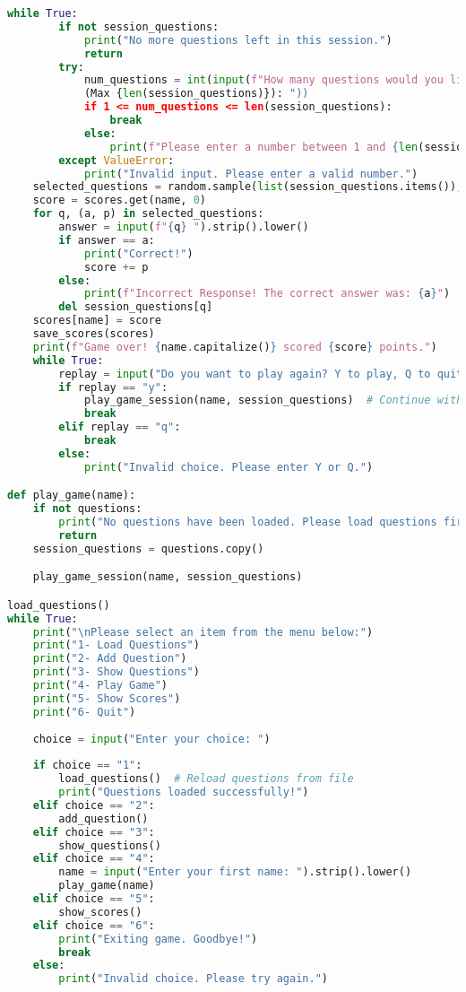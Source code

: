 \documentclass{article}
\begin{document}
\begin{lstlisting}[language=Python]
    while True:
        if not session_questions:
            print("No more questions left in this session.")
            return 
        try:
            num_questions = int(input(f"How many questions would you like to attempt? 
            (Max {len(session_questions)}): "))
            if 1 <= num_questions <= len(session_questions):
                break
            else:
                print(f"Please enter a number between 1 and {len(session_questions)}.")
        except ValueError:
            print("Invalid input. Please enter a valid number.")
    selected_questions = random.sample(list(session_questions.items()), num_questions)
    score = scores.get(name, 0)
    for q, (a, p) in selected_questions:
        answer = input(f"{q} ").strip().lower()
        if answer == a:
            print("Correct!")
            score += p
        else:
            print(f"Incorrect Response! The correct answer was: {a}")
        del session_questions[q]  
    scores[name] = score
    save_scores(scores)
    print(f"Game over! {name.capitalize()} scored {score} points.")
    while True:
        replay = input("Do you want to play again? Y to play, Q to quit: ").strip().lower()
        if replay == "y":
            play_game_session(name, session_questions)  # Continue with remaining questions
            break
        elif replay == "q":
            break
        else:
            print("Invalid choice. Please enter Y or Q.")

def play_game(name):
    if not questions:
        print("No questions have been loaded. Please load questions first.")
        return
    session_questions = questions.copy()

    play_game_session(name, session_questions)

load_questions()
while True:
    print("\nPlease select an item from the menu below:")
    print("1- Load Questions")
    print("2- Add Question")
    print("3- Show Questions")
    print("4- Play Game")
    print("5- Show Scores")
    print("6- Quit")
        
    choice = input("Enter your choice: ")
        
    if choice == "1":
        load_questions()  # Reload questions from file
        print("Questions loaded successfully!")
    elif choice == "2":
        add_question()
    elif choice == "3":
        show_questions()
    elif choice == "4":
        name = input("Enter your first name: ").strip().lower() 
        play_game(name) 
    elif choice == "5":
        show_scores()
    elif choice == "6":
        print("Exiting game. Goodbye!")
        break
    else:
        print("Invalid choice. Please try again.")
\end{lstlisting}
\end{document}
